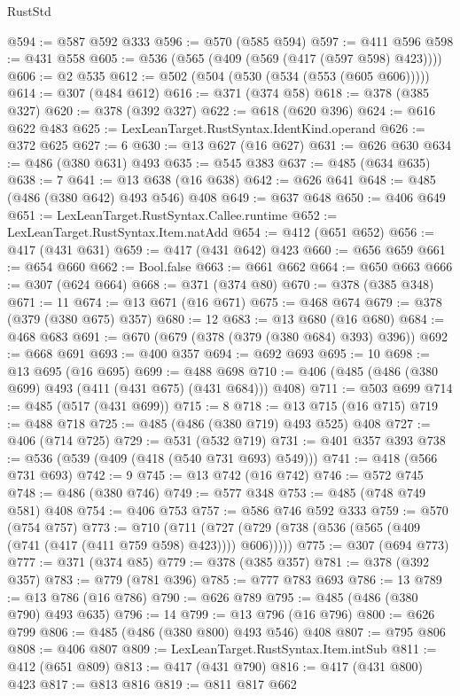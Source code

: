 \begin{lexlean}{RustStd}
\begin{coremodule}
@594 := @587 @592 @333
@596 := @570 (@585 @594)
@597 := @411 @596
@598 := @431 @558
@605 := @536 (@565 (@409 (@569 (@417 (@597 @598) @423))))
@606 := @2 @535
@612 := @502 (@504 (@530 (@534 (@553 (@605 @606)))))
@614 := @307 (@484 @612)
@616 := @371 (@374 @58)
@618 := @378 (@385 @327)
@620 := @378 (@392 @327)
@622 := @618 (@620 @396)
@624 := @616 @622 @483
@625 := LexLeanTarget.RustSyntax.IdentKind.operand
@626 := @372 @625
@627 := 6
@630 := @13 @627 (@16 @627)
@631 := @626 @630
@634 := @486 (@380 @631) @493
@635 := @545 @383
@637 := @485 (@634 @635)
@638 := 7
@641 := @13 @638 (@16 @638)
@642 := @626 @641
@648 := @485 (@486 (@380 @642) @493 @546) @408
@649 := @637 @648
@650 := @406 @649
@651 := LexLeanTarget.RustSyntax.Callee.runtime
@652 := LexLeanTarget.RustSyntax.Item.natAdd
@654 := @412 (@651 @652)
@656 := @417 (@431 @631)
@659 := @417 (@431 @642) @423
@660 := @656 @659
@661 := @654 @660
@662 := Bool.false
@663 := @661 @662
@664 := @650 @663
@666 := @307 (@624 @664)
@668 := @371 (@374 @80)
@670 := @378 (@385 @348)
@671 := 11
@674 := @13 @671 (@16 @671)
@675 := @468 @674
@679 := @378 (@379 (@380 @675) @357)
@680 := 12
@683 := @13 @680 (@16 @680)
@684 := @468 @683
@691 := @670 (@679 (@378 (@379 (@380 @684) @393) @396))
@692 := @668 @691
@693 := @400 @357
@694 := @692 @693
@695 := 10
@698 := @13 @695 (@16 @695)
@699 := @488 @698
@710 := @406 (@485 (@486 (@380 @699) @493 (@411 (@431 @675) (@431 @684))) @408)
@711 := @503 @699
@714 := @485 (@517 (@431 @699))
@715 := 8
@718 := @13 @715 (@16 @715)
@719 := @488 @718
@725 := @485 (@486 (@380 @719) @493 @525) @408
@727 := @406 (@714 @725)
@729 := @531 (@532 @719)
@731 := @401 @357 @393
@738 := @536 (@539 (@409 (@418 (@540 @731 @693) @549)))
@741 := @418 (@566 @731 @693)
@742 := 9
@745 := @13 @742 (@16 @742)
@746 := @572 @745
@748 := @486 (@380 @746)
@749 := @577 @348
@753 := @485 (@748 @749 @581) @408
@754 := @406 @753
@757 := @586 @746 @592 @333
@759 := @570 (@754 @757)
@773 := @710
    (@711 (@727 (@729 (@738 (@536 (@565 (@409 (@741 (@417 (@411 @759 @598) @423)))) @606)))))
@775 := @307 (@694 @773)
@777 := @371 (@374 @85)
@779 := @378 (@385 @357)
@781 := @378 (@392 @357)
@783 := @779 (@781 @396)
@785 := @777 @783 @693
@786 := 13
@789 := @13 @786 (@16 @786)
@790 := @626 @789
@795 := @485 (@486 (@380 @790) @493 @635)
@796 := 14
@799 := @13 @796 (@16 @796)
@800 := @626 @799
@806 := @485 (@486 (@380 @800) @493 @546) @408
@807 := @795 @806
@808 := @406 @807
@809 := LexLeanTarget.RustSyntax.Item.intSub
@811 := @412 (@651 @809)
@813 := @417 (@431 @790)
@816 := @417 (@431 @800) @423
@817 := @813 @816
@819 := @811 @817 @662

\end{coremodule}
\end{lexlean}
